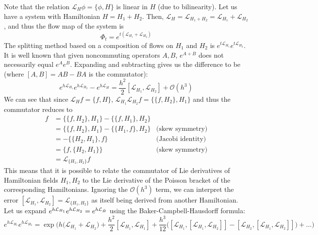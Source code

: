 \documentclass{article}
\begin{document}
      Note that the relation $\mathcal{L}_H \phi = \{\phi, H\}$ is linear in $H$ (due to bilinearity). Let us have a system with Hamiltonian $H = H_1 + H_2$. Then, $\mathcal{L}_H = \mathcal{L}_{H_1 + H_2} = \mathcal{L}_{H_1} + \mathcal{L}_{H_2}$, and thus the flow map of the system is 
      \begin{equation}
        \Phi_t = e^{ t(\mathcal{L}_{H_1} + \mathcal{L}_{H_2})}
      \end{equation}
      The splitting method based on a composition of flows on $H_1$ and $H_2$ is $e^{t \mathcal{L}_{H_1}} e^{t \mathcal{L}_{H_2}}$. It is well known that given noncommuting operators $A, B$, $e^{A + B}$ does not necessarily equal $e^A e^B$. Expanding and subtracting gives us the difference to be (where $[A, B] = AB - BA$ is the commutator): 
      \begin{equation}
        e^{h \mathcal{L}_{H_1}} e^{h \mathcal{L}_{H_2}} - e^{h \mathcal{L}_H} = \frac{h^2}{2} [\mathcal{L}_{H_1}, \mathcal{L}_{H_2}] + \mathcal{O}(h^3)
      \end{equation}
      We can see that since $\mathcal{L}_{H} f = \{f, H\}$, $\mathcal{L}_{H_1} \mathcal{L}_{H_2} f = \{ \{f, H_2\}, H_1 \}$ and thus the commutator reduces to 
      \begin{align*}
        [\mathcal{L}_{H_1}, \mathcal{L}_{H_2}] f & = \{ \{ f, H_2\}, H_1\} - \{ \{ f, H_1\}, H_2\} & \\
        & = \{ \{ f, H_2\}, H_1\} - \{ \{ H_1, f\}, H_2\} & \text{(skew symmetry)}\\
        & = - \{ \{H_2, H_1\}, f \} & \text{(Jacobi identity)} \\
        & = \{f, \{H_2, H_1\}\} & \text{(skew symmetry)} \\
        & = \mathcal{L}_{\{H_1, H_2\}} f 
      \end{align*}
      This means that it is possible to relate the commutator of Lie derivatives of Hamiltonian fields $H_1, H_2$ to the Lie derivative of the Poisson bracket of the corresponding Hamiltonians. Ignoring the $\mathcal{O}(h^3)$ term, we can interpret the error $[\mathcal{L}_{H_1}, \mathcal{L}_{H_2}] = \mathcal{L}_{\{H_1, H_2\}}$ as itself being derived from another Hamiltonian. Let us expand $e^{h \mathcal{L}_{H_1}} e^{h \mathcal{L}_{H_2}} = e^{h \mathcal{L}_{\Tilde{H}}}$ using the Baker-Campbell-Hausdorff formula: 
      \begin{equation}
        e^{h \mathcal{L}_{H_1}} e^{h \mathcal{L}_{H_2}} = \exp \bigg( h\big(\mathcal{L}_{H_1} + \mathcal{L}_{H_2}\big) + \frac{h^2}{2} [\mathcal{L}_{H_1}, \mathcal{L}_{H_1}] + \frac{h^3}{12} \big( [\mathcal{L}_{H_1}, [\mathcal{L}_{H_1}, \mathcal{L}_{H_2}]] - [\mathcal{L}_{H_2}, [\mathcal{L}_{H_1}, \mathcal{L}_{H_2}]] \big) + \ldots \bigg)
      \end{equation}
\end{document}
